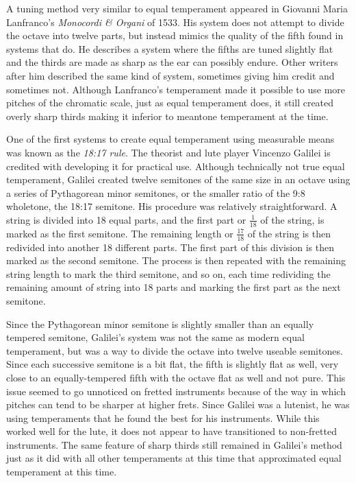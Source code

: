 A tuning method very similar to equal temperament appeared in Giovanni Maria
Lanfranco's \textit{Monocordi \& Organi} of 1533.  His system does not attempt to
divide the octave into twelve parts, but instead mimics the quality of the fifth found
in systems that do.  He describes a system where the fifths are tuned slightly flat and
the thirds are made as sharp as the ear can possibly endure. \autocite[45]{MB:1} Other
writers after him described the same kind of system, sometimes giving him credit and
sometimes not.  Although Lanfranco's temperament made it possible to use more pitches
of the chromatic scale, just as equal temperament does, it still created overly sharp
thirds making it inferior to meantone temperament at the time.

One of the first systems to create equal temperament using measurable means was known
as the \textit{18:17 rule}. The theorist and lute player Vincenzo Galilei is credited
with developing it for practical use. \autocite[57]{MB:1}  Although technically not
true equal temperament, Galilei created twelve semitones of the same size in an octave
using a series of Pythagorean minor semitones, or the smaller ratio of the 9:8
wholetone, the 18:17 semitone.  His procedure was relatively straightforward.  A string
is divided into 18 equal parts, and the first part or $ \frac{1}{18} $ of the string,
is marked as the first semitone.  The remaining length or $ \frac{17}{18} $ of the
string is then redivided into another 18 different parts.  The first part of this
division is then marked as the second semitone.  The process is then repeated with the
remaining string length to mark the third semitone, and so on, each time redividing the
remaining amount of string into 18 parts and marking the first part as the next
semitone.

Since the Pythagorean minor semitone is slightly smaller than an equally tempered
semitone, Galilei's system was not the same as modern equal temperament, but was a way
to divide the octave into twelve useable semitones. Since each successive semitone is a
bit flat, the fifth is slightly flat as well, very close to an equally-tempered fifth
with the octave flat as well and not pure.  This issue seemed to go unnoticed on
fretted instruments because of the way in which pitches can tend to be sharper at
higher frets.  Since Galilei was a lutenist, he was using temperaments that he found
the best for his instruments.  While this worked well for the lute, it does not appear
to have transitioned to non-fretted instruments.  The same feature of sharp thirds
still remained in Galilei's method just as it did with all other temperaments at this
time that approximated equal temperament at this time.

